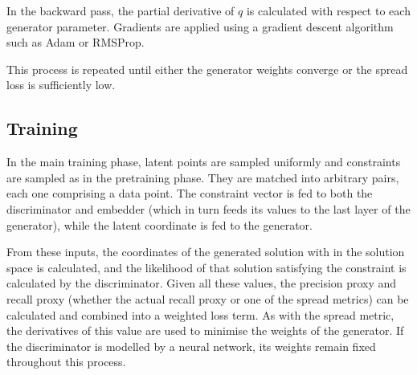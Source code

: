 \documentclass[../../main.tex]{subfiles}
\begin{document}
In the backward pass, the partial derivative of $q$ is calculated with respect to each generator parameter.
Gradients are applied using a gradient descent algorithm such as Adam or RMSProp.

This process is repeated until either the generator weights converge or the spread loss is sufficiently low.

\subsection{Training}

In the main training phase, latent points are sampled uniformly and constraints are sampled as in the pretraining phase.
They are matched into arbitrary pairs, each one comprising a data point.
The constraint vector is fed to both the discriminator and embedder (which in turn feeds its values to the last layer of the generator), while the latent coordinate is fed to the generator.

From these inputs, the coordinates of the generated solution with in the solution space is calculated, and the likelihood of that solution satisfying the constraint is calculated by the discriminator.
Given all these values, the precision proxy and recall proxy (whether the actual recall proxy or one of the spread metrics) can be calculated and combined into a weighted loss term.
As with the spread metric, the derivatives of this value are used to minimise the weights of the generator.
If the discriminator is modelled by a neural network, its weights remain fixed throughout this process.
\end{document}
